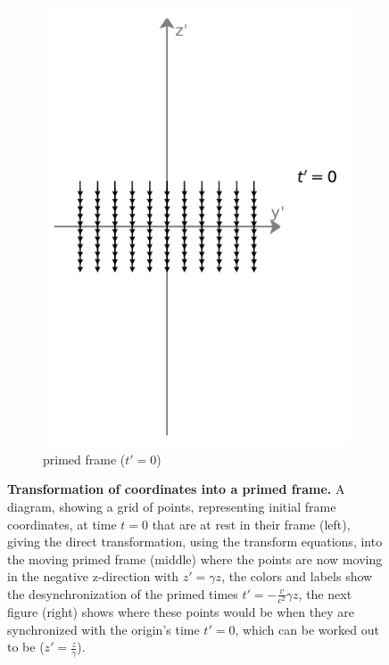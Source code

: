 \begin{figure}[H]
\begin{subfigure}{0.29\textwidth}
		\includegraphics[width=\textwidth]{images/pdf/coord_transform_primed_sychronised.pdf}
		\caption{primed frame (${t{'}}=0$)}
		\label{fig: coordinate transform subfig_3}
	\end{subfigure}
	\caption{\textbf{Transformation of coordinates into a primed frame.} A diagram, showing a grid of points, representing initial frame coordinates, at time ${t} = 0$ that are at rest in their frame (left), giving the direct transformation, using the transform equations, into the moving primed frame (middle) where the points are now moving in the negative z-direction with ${z{'}} = {\gamma} {z}$, the colors and labels show the desynchronization of the primed times ${t{'}} = -\frac{{v}}{{c}^2} {\gamma} {z}$, the next figure (right) shows where these points would be when they are synchronized with the origin's time ${t{'}} = 0$, which can be worked out to be (${z{'}} = \frac{{z}}{{\gamma}}$).}
	\label{fig: coordinate transform}
\end{figure}

